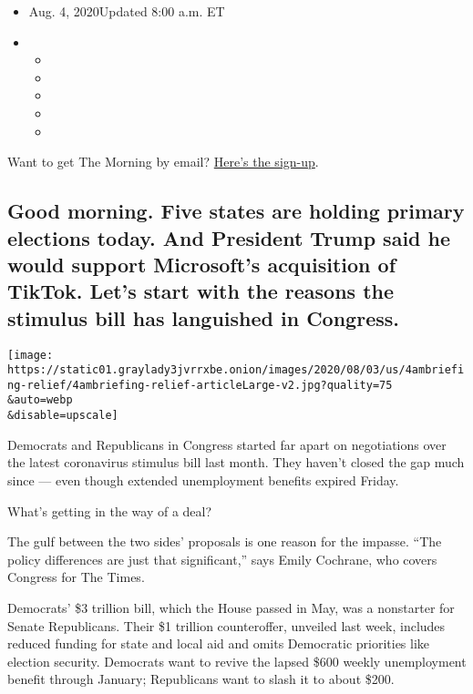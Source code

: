 \begin{itemize}
\item
  Aug. 4, 2020Updated 8:00 a.m. ET
\item
  \begin{itemize}
  \item
  \item
  \item
  \item
  \item
  \end{itemize}
\end{itemize}

Want to get The Morning by email?
\href{https://www.nytimes3xbfgragh.onion/newsletters/morning-briefing}{Here's
the sign-up}.

\hypertarget{good-morning-five-states-are-holding-primary-elections-today-and-president-trump-said-he-would-support-microsofts-acquisition-of-tiktok-lets-start-with-the-reasons-the-stimulus-bill-has-languished-in-congress}{%
\subsection{Good morning. Five states are holding primary elections
today. And President Trump said he would support Microsoft's acquisition
of TikTok. Let's start with the reasons the stimulus bill has languished
in
Congress.}\label{good-morning-five-states-are-holding-primary-elections-today-and-president-trump-said-he-would-support-microsofts-acquisition-of-tiktok-lets-start-with-the-reasons-the-stimulus-bill-has-languished-in-congress}}

\texttt{[image: https://static01.graylady3jvrrxbe.onion/images/2020/08/03/us/4ambriefing-relief/4ambriefing-relief-articleLarge-v2.jpg?quality=75\\\&auto=webp\\\&disable=upscale]}

Democrats and Republicans in Congress started far apart on negotiations
over the latest coronavirus stimulus bill last month. They haven't
closed the gap much since --- even though extended unemployment benefits
expired Friday.

What's getting in the way of a deal?

The gulf between the two sides' proposals is one reason for the impasse.
``The policy differences are just that significant,'' says Emily
Cochrane, who covers Congress for The Times.

Democrats' \$3 trillion bill, which the House passed in May, was a
nonstarter for Senate Republicans. Their \$1 trillion counteroffer,
unveiled last week, includes reduced funding for state and local aid and
omits Democratic priorities like election security. Democrats want to
revive the lapsed \$600 weekly unemployment benefit through January;
Republicans want to slash it to about \$200.

